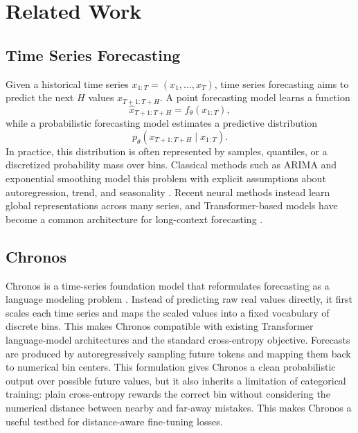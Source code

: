 \documentclass{article}
\begin{document}
\section{Related Work}

\subsection{Time Series Forecasting}

Given a historical time series $x_{1:T}=(x_1,\ldots,x_T)$, time series
forecasting aims to predict the next $H$ values
$x_{T+1:T+H}$.  A point forecasting model learns a function
\begin{equation}
    \hat{x}_{T+1:T+H}=f_\theta(x_{1:T}),
\end{equation}
while a probabilistic forecasting model estimates a predictive distribution
\begin{equation}
    p_\theta(x_{T+1:T+H}\mid x_{1:T}).
\end{equation}
In practice, this distribution is often represented by samples, quantiles, or a
discretized probability mass over bins.  Classical methods such as ARIMA and
exponential smoothing model this problem with explicit assumptions about
autoregression, trend, and seasonality
\citep{box1970time,winters1960forecasting}.  Recent neural methods instead
learn global representations across many series, and Transformer-based models
have become a common architecture for long-context forecasting
\citep{vaswani2017attention,zhou2021informer,wu2021autoformer,nie2023patchtst}.

\subsection{Chronos}

Chronos is a time-series foundation model that reformulates forecasting as a
language modeling problem \citep{ansari2024chronos}.  Instead of predicting raw
real values directly, it first scales each time series and maps the scaled
values into a fixed vocabulary of discrete bins.  This makes Chronos compatible
with existing Transformer language-model architectures and the standard
cross-entropy objective.  Forecasts are produced by autoregressively sampling
future tokens and mapping them back to numerical bin centers.  This formulation
gives Chronos a clean probabilistic output over possible future values, but it
also inherits a limitation of categorical training: plain cross-entropy rewards
the correct bin without considering the numerical distance between nearby and
far-away mistakes.  This makes Chronos a useful testbed for distance-aware
fine-tuning losses.
\end{document}
